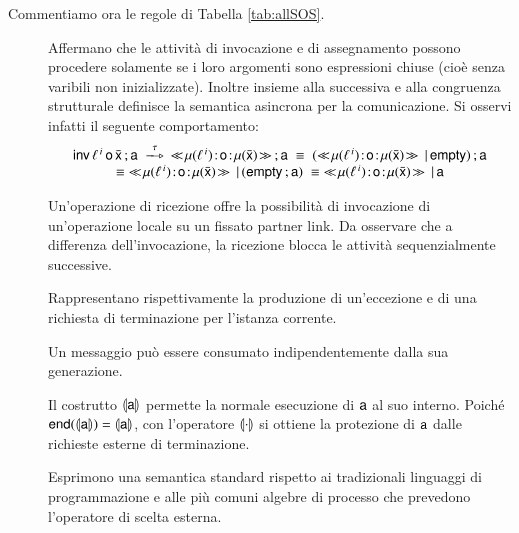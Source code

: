 Commentiamo ora le regole di Tabella \ref{tab:allSOS}.
\begin{description}
  \item[ ] 
  Affermano che le attività di invocazione e di assegnamento
  possono procedere solamente se i loro argomenti sono espressioni
  chiuse (cioè senza varibili non inizializzate). Inoltre  insieme 
  alla successiva  e alla congruenza strutturale
  definisce la semantica asincrona per la comunicazione. Si osservi infatti il
  seguente comportamento:
  $$
  \begin{array}{c}
  	\xinv{\plinv}{\xo}{\bar{\xx}} \xsucc \xs 
  	\; \bpeltsarrow{\xtau} \;
  	\xinstnostate{\xsigma}{\,\xmsg{\xsigma(\plinv)}{\xo}{\xsigma(\bar{\xx})}} \xsucc \xs 
  	\; \xequiv \; 
  	( \xmsg{\xsigma(\plinv)}{\xo}{\xsigma(\bar{\xx})} \xpar \xskip) \xsucc \xs
  	\\ \xequiv \;
  	\xmsg{\xsigma(\plinv)}{\xo}{\xsigma(\bar{\xx})} \xpar (\xskip \xsucc \xs )
  	\; \xequiv \;
  	\xmsg{\xsigma(\plinv)}{\xo}{\xsigma(\bar{\xx})} \xpar \xs 
  \end{array}
  $$
   
  \item[] Un'operazione di ricezione offre la
  possibilità di invocazione di un'operazione locale su un fissato partner
  link. Da osservare che a differenza dell'invocazione, la ricezione blocca le
  attività sequenzialmente successive.
  
  \item[ ] Rappresentano
  rispettivamente la produzione di un'eccezione e di una richiesta di
  terminazione per l'istanza corrente.
  
  \item[] Un messaggio può essere consumato
  indipendentemente dalla sua generazione.
  
  \item[] Il costrutto $\llparenthesis {\sf a}\rrparenthesis$ permette la
  normale esecuzione di ${\sf a}$ al suo interno. Poiché
  ${\sf end}(\llparenthesis {\sf a}\rrparenthesis)=\llparenthesis {\sf a}\rrparenthesis$, con l'operatore $\llparenthesis \cdot\rrparenthesis$ si ottiene
  la protezione di ${\sf a}$ dalle richieste esterne di terminazione.
 
  \item[  
  ] Esprimono una semantica standard rispetto ai
  tradizionali linguaggi di programmazione e alle più comuni algebre di
  processo che prevedono l'operatore di scelta esterna.
  

\end{description}
